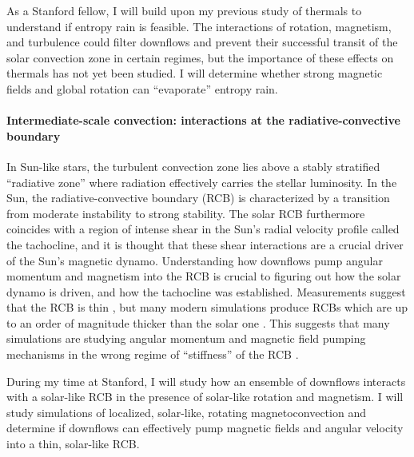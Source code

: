 \documentclass[aps, pre, onecolumn, nofootinbib, notitlepage, groupedaddress, amsfonts, amssymb, amsmath]{revtex4-1}
\begin{document}
As a Stanford fellow, I will build upon my previous study of thermals \citep{andersLB2019} to understand if entropy rain is feasible.
The interactions of rotation, magnetism, and turbulence could filter downflows and prevent their successful transit of the solar convection zone in certain regimes, but the importance of these effects on thermals has not yet been studied.
I will determine whether strong magnetic fields and global rotation can ``evaporate'' entropy rain.

\paragraph*{Intermediate-scale convection: interactions at the radiative-convective boundary}
In Sun-like stars, the turbulent convection zone lies above a stably stratified ``radiative zone'' where radiation effectively carries the stellar luminosity.
In the Sun, the radiative-convective boundary (RCB) is characterized by a transition from moderate instability to strong stability.
The solar RCB furthermore coincides with a region of intense shear in the Sun's radial velocity profile called the tachocline, and it is thought that these shear interactions are a crucial driver of the Sun's magnetic dynamo.
Understanding how downflows pump angular momentum and magnetism into the RCB is crucial to figuring out how the solar dynamo is driven, and how the tachocline was established.
Measurements suggest that the RCB is thin \citep{basu1997}, but many modern simulations produce RCBs which are up to an order of magnitude thicker than the solar one \citep{hotta2017}.
This suggests that many simulations are studying angular momentum and magnetic field pumping mechanisms in the wrong regime of ``stiffness'' of the RCB \citep{couston&all2017}.

During my time at Stanford, I will study how an ensemble of downflows interacts with a solar-like RCB in the presence of solar-like rotation and magnetism.
I will study simulations of localized, solar-like, rotating magnetoconvection and determine if downflows can effectively pump magnetic fields and angular velocity into a thin, solar-like RCB.
\end{document}
